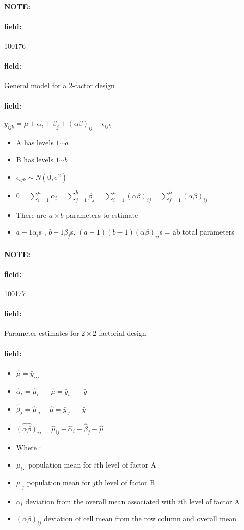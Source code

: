 \documentclass[12pt]{article}
\newenvironment{note}{\paragraph{NOTE:}}{}
\newenvironment{field}{\paragraph{field:}}{}
\begin{document}
\begin{note}
    \begin{field}
        \tiny 100176
    \end{field}
    \begin{field}
        General model for a 2-factor design
    \end{field}
    \begin{field}
        $y_{ijk} = \mu + \alpha_i + \beta_j + (\alpha\beta)_{ij} + \epsilon_{ijk}$
        \begin{itemize}
          \item A has levels $1 \cdots a$
          \item B has levels $1 \cdots b$
          \item $\epsilon_{ijk} \sim N(0,\sigma^2)$
          \item $0 = \sum_{i=1}^a \alpha_i = \sum_{j=1}^b \beta_j = \sum_{i=1}^a (\alpha\beta)_{ij} = \sum_{j=1}^b (\alpha\beta)_{ij}$
          \item There are $a \times b $ parameters to estimate
          \item $a-1 \alpha_i$s , $b-1 \beta_j$s, $(a-1)(b-1) (\alpha\beta)_{ij}$s = ab total parameters
        \end{itemize}
    \end{field}
\end{note}

\begin{note}
    \begin{field}
        \tiny 100177
    \end{field}
    \begin{field}
        Parameter estimates for $2 \times 2$ factorial design
    \end{field}
    \begin{field}
        \begin{itemize}
          \item $\hat{\mu} = \bar{y}_{\cdot\cdot \cdot}$
          \item $\hat{\alpha}_i = \hat{\mu}_{i\cdot} - \hat{\mu} = \bar{y}_{i\cdot \cdot} - \bar{y}_{\cdot \cdot \cdot }$
          \item $\hat{\beta}_j =\hat{\mu}_{\cdot j} - \hat{\mu} = \bar{y}_{\cdot j \cdot} - \bar{y}_{\cdot \cdot \cdot } $
          \item $\hat{(\alpha\beta)}_{ij} = \hat{\mu}_{ij} - \hat{\alpha}_i - \hat{\beta}_j - \hat{\mu}$
          \item Where :


          \item $\mu_{i\cdot }$ population mean for $i$th level of factor A
          \item $\mu_{\cdot j}$ population mean for $j$th level of factor B
          \item $\alpha_i$ deviation from the overall mean associated with $i$th level of factor A
          \item $(\alpha\beta)_{ij}$ deviation of cell mean from the row column and overall mean
        \end{itemize}
    \end{field}
\end{note}
\end{document}
